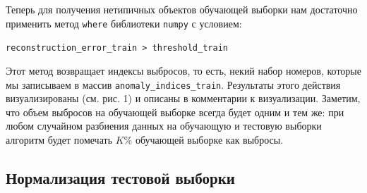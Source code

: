 \documentclass[a4paper,12pt]{article}
\begin{document}
Теперь для получения нетипичных объектов обучающей выборки нам достаточно применить метод \texttt{where} библиотеки \texttt{numpy} с условием:

\medskip
\noindent
\texttt{reconstruction\_error\_train > threshold\_train}

\medskip
\noindent
Этот метод возвращает индексы выбросов, то есть, некий набор номеров, которые мы записываем в массив \texttt{anomaly\_indices\_train}. Результаты этого действия визуализированы (см. рис. 1) и описаны в комментарии к визуализации. Заметим, что объем выбросов на обучающей выборке всегда будет одним и тем же: при любом случайном разбиения данных на обучающую и тестовую выборки алгоритм будет помечать $K$\% обучающей выборке как выбросы.

\subsection{Нормализация тестовой выборки}
\end{document}
